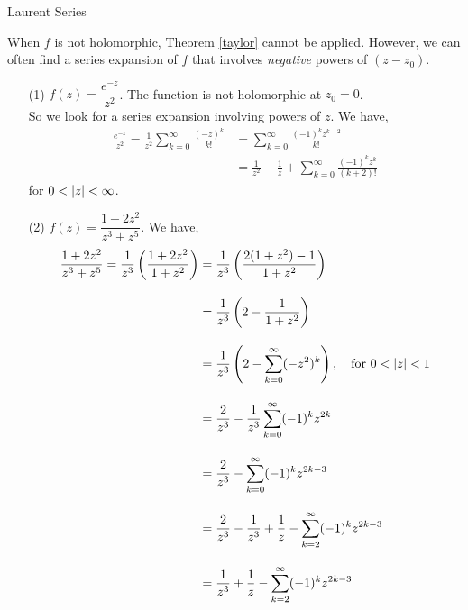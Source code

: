 \vspace*{1em}

\begin{mdframed}
\begin{center}
{\Large Laurent Series}
\end{center}
\end{mdframed}

\begin{remark}
When $f$ is not holomorphic, Theorem \ref{taylor} cannot be applied. However, we can often find a series expansion of $f$ that involves \emph{negative} powers of $(z - z_0)$.
\end{remark}

\vspace*{1em}

\begin{example}\hfill
\begin{itemize}
\item[(1)] $f(z) = \dfrac{e^{-z}}{z^2}$. The function is not holomorphic at $z_0 = 0$.\\[0.5em]
So we look for a series expansion involving powers of $z$. We have,
\begin{align*}
\frac{e^{-z}}{z^2} = \frac{1}{z^2}\sum_{k=0}^\infty\frac{(-z)^k}{k!} &= \sum_{k=0}^\infty\frac{(-1)^kz^{k-2}}{k!}\\[1em]
 &=\frac{1}{z^2} - \frac{1}{z} + \sum_{k=0}^\infty\frac{(-1)^kz^k}{(k+2)!}
\end{align*}
for $0 < \left\lvert z\right\rvert < \infty$.

\item[(2)] $f(z) = \dfrac{1 + 2z^2}{z^3 + z^5}$. We have,
\begin{align*}
\frac{1 + 2z^2}{z^3 + z^5} = \frac{1}{z^3}\left(\frac{1 + 2z^2}{1 + z^2}\right) &= \frac{1}{z^3}\left(\frac{2(1 + z^2) - 1}{1 + z^2}\right)\\[1em]
 &= \frac{1}{z^3}\left(2 - \frac{1}{1 + z^2}\right)\\[1em]
 &= \frac{1}{z^3}\left(2 - \sum_{k=0}^\infty (-z^2)^k\right),\quad \text{for }0 < \left\lvert z\right\rvert < 1\\[1em]
 &= \frac{2}{z^3} - \frac{1}{z^3}\sum_{k=0}^\infty (-1)^kz^{2k}\\[1em]
 &= \frac{2}{z^3} - \sum_{k=0}^\infty (-1)^kz^{2k-3}\\[1em]
 &= \frac{2}{z^3} - \frac{1}{z^3} + \frac{1}{z} - \sum_{k=2}^\infty (-1)^kz^{2k-3}\\[1em]
 &= \frac{1}{z^3} + \frac{1}{z} - \sum_{k=2}^\infty (-1)^kz^{2k-3}
\end{align*}


\end{itemize}
\end{example}
